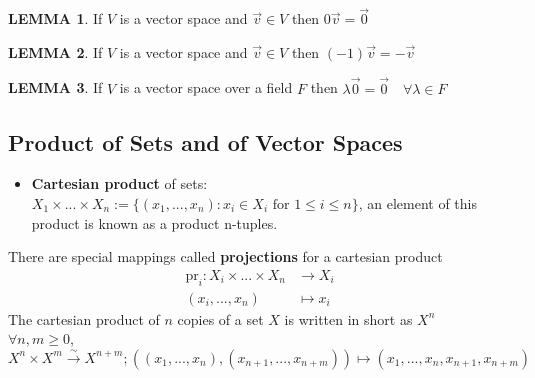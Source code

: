 \documentclass[10pt]{article}
\theoremstyle{definition}
\newtheorem{lemma}{LEMMA}[subsection]
\begin{document}
\begin{lemma}
    If $V$ is a vector space and $\overrightarrow{v} \in V$ then $0\overrightarrow{v} = \overrightarrow{0}$
\end{lemma}
\begin{lemma}
    If $V$ is a vector space and $\overrightarrow{v} \in V$ then $(-1)\overrightarrow{v} = -\overrightarrow{v}$
\end{lemma}
\begin{lemma}
    If $V$ is a vector space over a field $F$ then $\lambda\overrightarrow{0} = \overrightarrow{0} \quad \forall \lambda\in F$
\end{lemma}

\subsection{Product of Sets and of Vector Spaces}
\begin{itemize}
    \item
          \textbf{Cartesian product} of sets: $X_1 \times ... \times X_n := \{(x_1,...,x_n):x_i\in X_i \text{ for } 1 \leq i \leq n\}$, an element of this product is known as a product n-tuples.\newline
\end{itemize}
There are special mappings called \textbf{projections} for a cartesian product
\[\begin{split}
        \text{pr}_i: X_i\times ... \times X_n &\rightarrow X_i\\
        (x_i,...,x_n) &\mapsto x_i
    \end{split}\]
The cartesian product of $n$ copies of a set $X$ is written in short as $X^n$\\

$\forall n,m \geq 0$, $X^n\times X^m\xrightarrow{\sim} X^{n+m}; ((x_1,...,x_n),(x_{n+1},...,x_{n+m}))\mapsto(x_1,...,x_n,x_{n+1},x_{n+m})$

\end{document}
